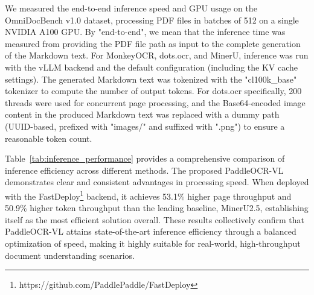 \documentclass[11pt, a4paper,logo,  copyright, nonumbering]{paddleocr}
\begin{document}

We measured the end-to-end inference speed and GPU usage on the OmniDocBench v1.0 dataset, processing PDF files in batches of 512 on a single NVIDIA A100 GPU. By "end-to-end", we mean that the inference time was measured from providing the PDF file path as input to the complete generation of the Markdown text. For MonkeyOCR, dots.ocr, and MinerU, inference was run with the vLLM backend and the default configuration (including the KV cache settings). The generated Markdown text was tokenized with the "cl100k\_base" tokenizer to compute the number of output tokens. For dots.ocr specifically, 200 threads were used for concurrent page processing, and the Base64-encoded image content in the produced Markdown text was replaced with a dummy path (UUID-based, prefixed with "images/" and suffixed with ".png") to ensure a reasonable token count.

Table~\ref{tab:inference_performance} provides a comprehensive comparison of inference efficiency across different methods. The proposed PaddleOCR-VL demonstrates clear and consistent advantages in processing speed. When deployed with the FastDeploy\footnote{https://github.com/PaddlePaddle/FastDeploy} backend, it achieves 53.1\% higher page throughput and 50.9\% higher token throughput than the leading baseline, MinerU2.5, establishing itself as the most efficient solution overall. These results collectively confirm that PaddleOCR-VL attains state-of-the-art inference efficiency through a balanced optimization of speed, making it highly suitable for real-world, high-throughput document understanding scenarios.
\end{document}
